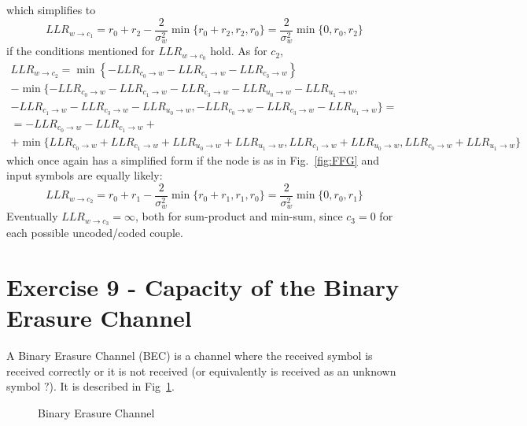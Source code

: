 \documentclass[10pt]{article}
\begin{document}
which simplifies to 
\begin{equation}
	LLR_{w \rightarrow c_1} =  r_0 + r_2 - \frac{2}{\sigma_w^2} \min\{r_0+r_2, r_2, r_0\}= \frac{2}{\sigma_w^2}\min\{0, r_0, r_2\}
\end{equation}
if the conditions mentioned for $LLR_{w \rightarrow c_0}$ hold.
As for $c_2$, 
\begin{multline}
	LLR_{w \rightarrow c_2} = \min\left\{-LLR_{c_0 \rightarrow w}-LLR_{c_1\rightarrow w}-LLR_{c_3 \rightarrow w}\right\} \\ - \min\{-LLR_{c_0 \rightarrow w}-LLR_{c_1\rightarrow w}-LLR_{c_3 \rightarrow w}-LLR_{u_0 \rightarrow w}-LLR_{u_1 \rightarrow w}, \\ -LLR_{c_1\rightarrow w}-LLR_{c_3 \rightarrow w}-LLR_{u_0 \rightarrow w}, -LLR_{c_0 \rightarrow w}-LLR_{c_3 \rightarrow w}-LLR_{u_1 \rightarrow w}\}
	 = \\
	= - LLR_{c_0 \rightarrow w} - LLR_{c_1\rightarrow w} + \\ + \min\{LLR_{c_0 \rightarrow w}+LLR_{c_1\rightarrow w}+LLR_{u_0 \rightarrow w}+LLR_{u_1 \rightarrow w}, LLR_{c_1\rightarrow w}+LLR_{u_0 \rightarrow w}, LLR_{c_0 \rightarrow w}+LLR_{u_1 \rightarrow w}\}
\end{multline}
which once again has a simplified form if the node is as in Fig.~\ref{fig:FFG} and input symbols are equally likely:
\begin{equation}
	LLR_{w \rightarrow c_2} = r_0 + r_1 - \frac{2}{\sigma_w^2} \min\{r_0+r_1, r_1, r_0\} = \frac{2}{\sigma_w^2}\min\{0, r_0, r_1\}
\end{equation}
Eventually $LLR_{w \rightarrow c_3} = \infty$, both for sum-product and min-sum, since $c_3 = 0$ for each possible uncoded/coded couple.

\section*{Exercise 9 - Capacity of the Binary Erasure Channel}
A Binary Erasure Channel (BEC) is a channel where the received symbol is received correctly or it is not received (or equivalently is received as an unknown symbol $?$). It is described in Fig~\ref{fig:bec}.
\begin{figure}[h]
\centering
{}
\caption{Binary Erasure Channel}
\label{fig:bec}
\end{figure}
\end{document}
